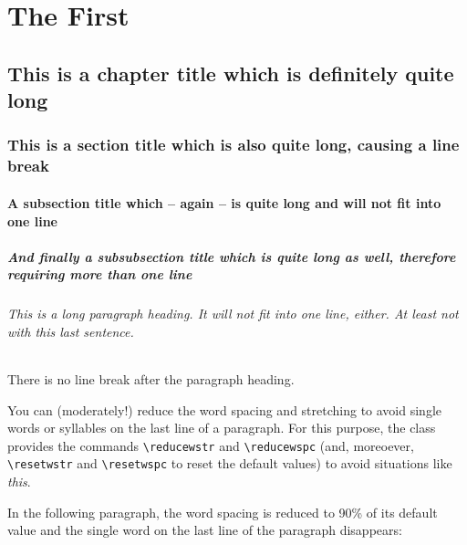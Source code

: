 \mainmatter

\part{The First}

\chapter{This is a chapter title which is definitely quite long}

\section{This is a section title which is also quite long, causing a line break}

\subsection{A subsection title which -- again -- is quite long and will not fit into one line}

\subsubsection{And finally a subsubsection title which is quite long as well, therefore requiring more than one line}

\paragraph{This is a long paragraph heading. It will not fit into one line, either. At least not with this last sentence.}

There is no line break after the paragraph heading.

You can (moderately!) reduce the word spacing and stretching to avoid single words or syllables on the last line of a paragraph. For this purpose, the class provides the commands \verb|\reducewstr| and \verb|\reducewspc| (and, moreoever, \verb|\resetwstr| and \verb|\resetwspc| to reset the default values) to avoid situations like \emph{this}.

In the following paragraph, the word spacing is reduced to 90\% of its default value and the single word on the last line of the paragraph disappears:

